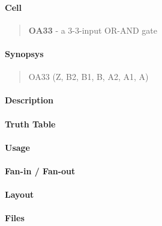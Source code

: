 \label{OA33}
\paragraph{Cell}
\begin{quote}
    \textbf{OA33} - a 3-3-input OR-AND gate
\end{quote}

\paragraph{Synopsys}
\begin{quote}
    OA33 (Z, B2, B1, B, A2, A1, A)
\end{quote}

\paragraph{Description}

%

\paragraph{Truth Table}
%

\paragraph{Usage}

\paragraph{Fan-in / Fan-out}

\paragraph{Layout}

\paragraph{Files}
